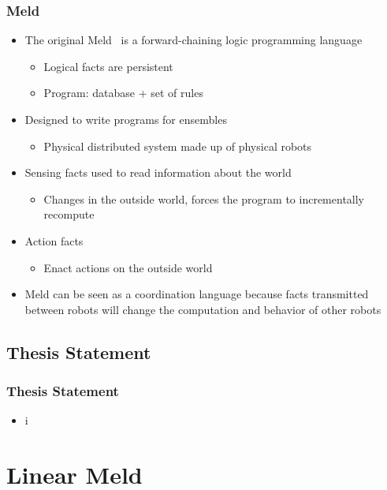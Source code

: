 \documentclass{beamer}
\begin{document}
\frame
{
   \frametitle{Meld}
   \begin{itemize}
      \item The original Meld~\cite{ashley-rollman-iclp09} is a forward-chaining logic programming language
      \begin{itemize}
         \item Logical facts are persistent
         \item Program: database + set of rules
      \end{itemize}
      
      \item Designed to write programs for ensembles
      \begin{itemize}
         \item Physical distributed system made up of physical robots
      \end{itemize}
      
      \item Sensing facts used to read information about the world
      \begin{itemize}
         \item Changes in the outside world, forces the program to incrementally recompute
      \end{itemize}
      
      \item Action facts
      \begin{itemize}
         \item Enact actions on the outside world
      \end{itemize}
      
      \item Meld can be seen as a coordination language because facts transmitted between robots will change the computation and behavior of other robots
   \end{itemize}
}

\subsection{Thesis Statement}

\frame
{
   \frametitle{Thesis Statement}
   \begin{itemize}
      \item i
   \end{itemize}
}   

\section{Linear Meld}
\end{document}
